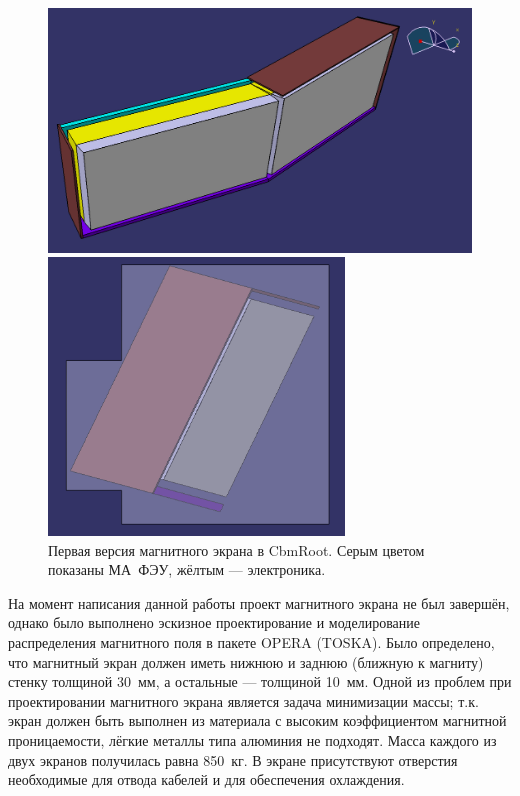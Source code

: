 \begin{figure}[H]
\begin{minipage}[b]{0.495\textwidth}
\includegraphics[width=1.0\textwidth]{pictures/ShieldingBox_MC.png}
\end{minipage}
\hspace{0.01\textwidth}
\begin{minipage}[b]{0.495\textwidth}
\includegraphics[width=0.7\textwidth]{pictures/ShieldingBox_MC2.png}
\end{minipage}
\caption{Первая версия магнитного экрана в CbmRoot. Серым цветом показаны МА~ФЭУ, жёлтым --- электроника.}
\label{fig:ShieldingBoxMC}
\end{figure}

На момент написания данной работы проект магнитного экрана не был завершён, однако было выполнено эскизное проектирование и моделирование распределения магнитного поля в пакете OPERA (TOSKA). Было определено, что магнитный экран должен иметь нижнюю и заднюю (ближную к магниту) стенку толщиной 30~мм, а остальные --- толщиной 10~мм. Одной из проблем при проектировании магнитного экрана является задача минимизации массы; т.к. экран должен быть выполнен из материала с высоким коэффициентом магнитной проницаемости, лёгкие металлы типа алюминия не подходят. Масса каждого из двух экранов получилась равна 850~кг. В экране присутствуют отверстия необходимые для отвода кабелей и для обеспечения охлаждения.

